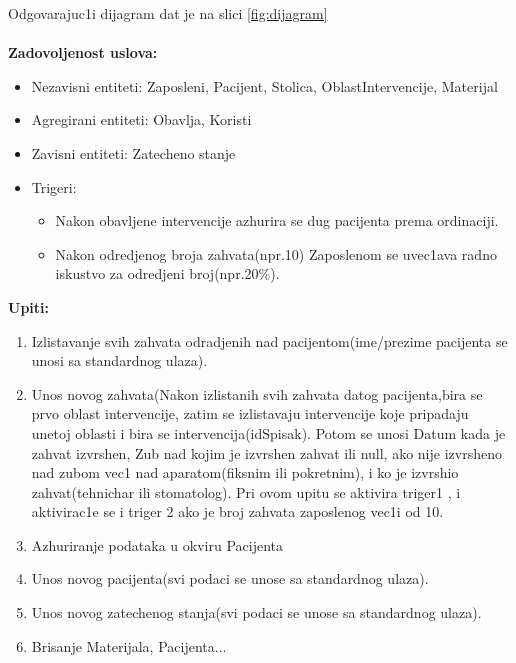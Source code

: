 \documentclass[10 pt]{article}
\begin{document}
Odgovarajuc1i dijagram dat je na slici \ref{fig:dijagram}
\\
\\
\textbf{Zadovoljenost uslova:}
\begin{itemize}
	\item Nezavisni entiteti: Zaposleni, Pacijent, Stolica, OblastIntervencije, Materijal
	\item Agregirani entiteti: Obavlja, Koristi
	\item Zavisni entiteti: Zatecheno stanje
	\item Trigeri: 
		\begin{itemize}
			\item Nakon obavljene intervencije azhurira se dug pacijenta prema ordinaciji.
			\item Nakon odredjenog broja zahvata(npr.10) Zaposlenom se uvec1ava radno iskustvo za odredjeni broj(npr.20\%). 
		\end{itemize}	
\end{itemize}


\textbf{Upiti:}
\begin{enumerate}
	\item Izlistavanje svih zahvata odradjenih nad pacijentom(ime/prezime pacijenta se unosi sa standardnog ulaza).
	\item Unos novog zahvata(Nakon izlistanih svih zahvata datog pacijenta,bira se prvo oblast intervencije, zatim se izlistavaju intervencije koje pripadaju unetoj oblasti i bira se intervencija(idSpisak). Potom se unosi Datum kada je zahvat izvrshen, Zub nad kojim je izvrshen zahvat ili null, ako nije izvrsheno nad zubom vec1 nad aparatom(fiksnim ili pokretnim), i ko je izvrshio zahvat(tehnichar ili stomatolog). Pri ovom upitu se aktivira triger1 , i aktivirac1e se i triger 2 ako je broj zahvata zaposlenog vec1i od 10. 
	\item Azhuriranje podataka u okviru Pacijenta 
	\item Unos novog pacijenta(svi podaci se unose sa standardnog ulaza).
	\item Unos novog zatechenog stanja(svi podaci se unose sa standardnog ulaza).
	\item Brisanje Materijala, Pacijenta...
\end{enumerate}
\end{document}
